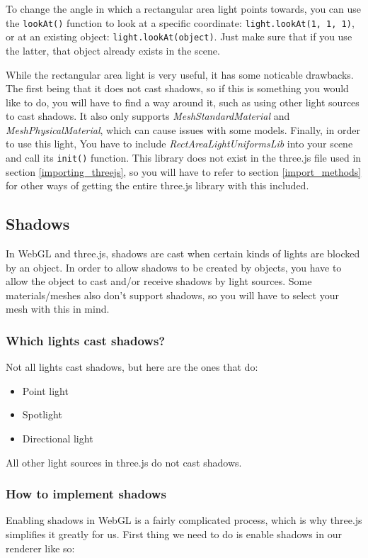 \documentclass[10pt,final,journal,compsoc]{IEEEtran}
\begin{document}
    To change the angle in which a rectangular area light points towards, you can use the \verb|lookAt()| function to look at a specific coordinate: \verb|light.lookAt(1, 1, 1)|, or at an existing object: \verb|light.lookAt(object)|. Just make sure that if you use the latter, that object already exists in the scene.
    
    While the rectangular area light is very useful, it has some noticable drawbacks. The first being that it does not cast shadows, so if this is something you would like to do, you will have to find a way around it, such as using other light sources to cast shadows. It also only supports \textit{MeshStandardMaterial} and \textit{MeshPhysicalMaterial}, which can cause issues with some models. Finally, in order to use this light, You have to include \textit{RectAreaLightUniformsLib} into your scene and call its \verb|init()| function. This library does not exist in the three.js file used in section \ref{importing_threejs}, so you will have to refer to section \ref{import_methods} for other ways of getting the entire three.js library with this included.
    
    \subsection{Shadows} \label{shadows}
    In WebGL and three.js, shadows are cast when certain kinds of lights are blocked by an object. In order to allow shadows to be created by objects, you have to allow the object to cast and/or receive shadows by light sources. Some materials/meshes also don't support shadows, so you will have to select your mesh with this in mind.
    
        \subsubsection{Which lights cast shadows?}
        Not all lights cast shadows, but here are the ones that do:
        
        \begin{itemize}
            \item Point light
            \item Spotlight
            \item Directional light
        \end{itemize}
        
        All other light sources in three.js do not cast shadows.
        
        \subsubsection{How to implement shadows}
        Enabling shadows in WebGL is a fairly complicated process, which is why three.js simplifies it greatly for us. First thing we need to do is enable shadows in our renderer like so:
        
\end{document}
